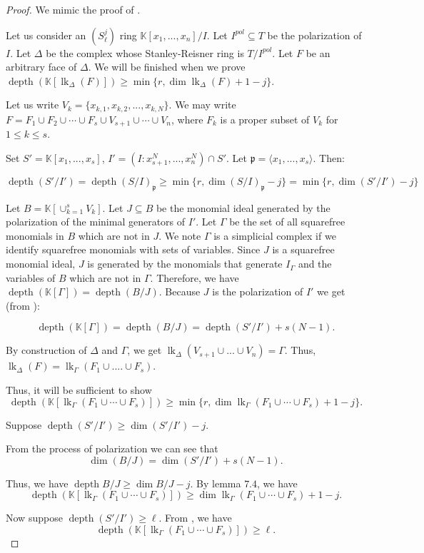 \documentclass[11pt]{amsart}
\numberwithin{equation}{section}
\theoremstyle{definition}
\theoremstyle{remark}
\newcommand{\lk}{\operatorname{lk}}
\newcommand{\depth}{\operatorname{depth}}
\begin{document}
\begin{proof}

We mimic the proof of \cite{MT09}.

Let us consider an $(S_\ell^j)$ ring $\mathbb{K}[x_1,...,x_n]/I$.  Let $I^{pol} \subseteq T$ be the polarization of $I$.  Let $\Delta$ be the complex whose Stanley-Reisner ring is $T/I^{pol}$.  Let $F$ be an arbitrary face of $\Delta$.  We will be finished when we prove $\depth (\mathbb{K}[ \lk_{\Delta}(F)]) \geq \min \{ r, \dim \lk_{\Delta} (F) +1-j \}$.

Let us write $V_k = \{ x_{k,1}, x_{k,2},...,x_{k,N} \}$.  We may write $F = F_1 \cup F_2 \cup \cdots \cup F_s \cup V_{s+1} \cup \cdots \cup V_n$, where $F_k$ is a proper subset of $V_k$ for $1 \leq k \leq s$.

Set $S' = \mathbb{K}[x_1,...,x_s]$, $I' = (I:x_{s+1}^N,...,x_n^N) \cap S'$.  Let $\mathfrak{p}= \langle x_1,...,x_s \rangle$.  Then:

\[ \depth(S'/I') = \depth(S/I)_\mathfrak{p} \geq \min \{r, \dim (S/I)_\mathfrak{p}-j \} = \min \{r, \dim (S'/I')-j \} \]

Let $B = \mathbb{K}[\cup_{k=1}^{s} V_k]$.  Let $J \subseteq B$ be the monomial ideal generated by the polarization of the minimal generators of $I'$.  Let $\Gamma$ be the set of all squarefree monomials in $B$ which are not in $J$.  We note $\Gamma$ is a simplicial complex if we identify squarefree monomials with sets of variables.  Since $J$ is a squarefree monomial ideal, $J$ is generated by the monomials that generate $I_{\Gamma}$ and the variables of $B$ which are not in $\Gamma$.  Therefore, we have $\depth (\mathbb{K}[\Gamma]) = \depth(B/J)$.  Because $J$ is  the polarization of $I'$ we get (from \cite{BH98}):

\[ \depth ( \mathbb{K}[\Gamma]) = \depth(B/J)=\depth(S'/I') +s(N-1). \]

By construction of $\Delta$ and $\Gamma$, we get $\lk_{\Delta}(V_{s+1} \cup ... \cup V_n) = \Gamma$.  Thus, $\lk_\Delta(F)=\lk_\Gamma(F_1 \cup .... \cup F_s)$.

Thus, it will be sufficient to show \[ \depth (\mathbb{K}[\lk_\Gamma(F_1 \cup \cdots \cup F_s)]) \geq \min \{ r, \dim \lk_\Gamma(F_1 \cup \cdots \cup F_s) +1-j \}. \]

Suppose $\depth (S'/I') \geq \dim (S'/I') - j$.  


From the process of polarization we can see that \[ \dim(B/J) = \dim(S'/I') + s(N-1). \]

Thus, we have $\depth B/J \geq \dim B/J - j.$  By lemma $7.4$, we have \[ \depth (\mathbb{K}[\lk_\Gamma(F_1 \cup \cdots \cup F_s)]) \geq \dim \lk_\Gamma(F_1 \cup \cdots \cup F_s) +1-j. \]

Now suppose $\depth (S'/I') \geq \ell$.  From \cite{MT09}, we have \[ \depth (\mathbb{K}[\lk_\Gamma(F_1 \cup \cdots \cup F_s)]) \geq \ell. \]

\end{proof}
\end{document}
